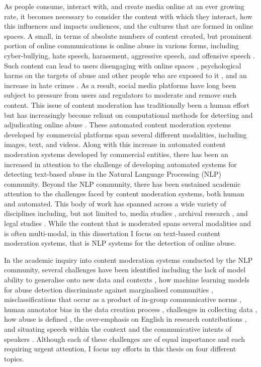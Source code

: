 As people consume, interact with, and create media online at an ever growing rate, it becomes necessary to consider the content with which they interact, how this influences and impacts audiences, and the cultures that are formed in online spaces.
A small, in terms of absolute numbers of content created, but prominent portion of online communications is online abuse in various forms, including cyber-bullying, hate speech, harassment, aggressive speech, and offensive speech \citep{Turing:2019}.
Such content can lead to users disengaging with online spaces \citep{Users leaving}, psychological harms on the targets of abuse and other people who are exposed to it \citep{Paper on negative effects of witnessing abuse}, and an increase in hate crimes \citep{Muller:2020}.
As a result, social media platforms have long been subject to pressure from users and regulators to moderate and remove such content.
This issue of content moderation has traditionally been a human effort \citep{Roberts:2019} but has increasingly become reliant on computational methods for detecting and adjudicating online abuse \citep{Facebookreports}.
These automated content moderation systems developed by commercial platforms span several different modalities, including images, text, and videos.
Along with this increase in automated content moderation systems developed by commercial entities, there has been an increased in attention to the challenge of developing automated systems for detecting text-based abuse in the Natural Language Processing (NLP) community.
Beyond the NLP community, there has been sustained academic attention to the challenges faced by content moderation systems, both human and automated.
This body of work has spanned across a wide variety of disciplines including, but not limited to, media studies \citep{Gillespie:2020,Gerrard:2020}, archival research \citep{Thylstrup:2019,Agostinho:2019}, and legal studies \citep{Cobbe:2020,Llanso:2020}.
While the content that is moderated spans several modalities and is often multi-modal, in this dissertation I focus on text-based content moderation systems, that is NLP systems for the detection of online abuse.

In the academic inquiry into content moderation systems conducted by the NLP community, several challenges have been identified including the lack of model ability to generalise onto new data and contexts \citep{Waseem:2016,Fortuna:2020}, how machine learning models for abuse detection discriminate against marginalised communities \citep{Davidson:2019,Dias:2020}, misclassifications that occur as a product of in-group communicative norms \citep{Dias:2020}, human annotator bias in the data creation process \citep{Waseem:2018,Davidson:2019}, challenges in collecting data \citep{Wiegand:2019,Vidgen:directions:2020}, how abuse is defined \citep{Waseem:2017}, the over-emphasis on English in research contributions \citep{Vidgen:directions:2020}, and situating speech within the context and the communicative intents of speakers \citep{Bender:2021}.
Although each of these challenges are of equal importance and each requiring urgent attention, I focus my efforts in this thesis on four different topics.

